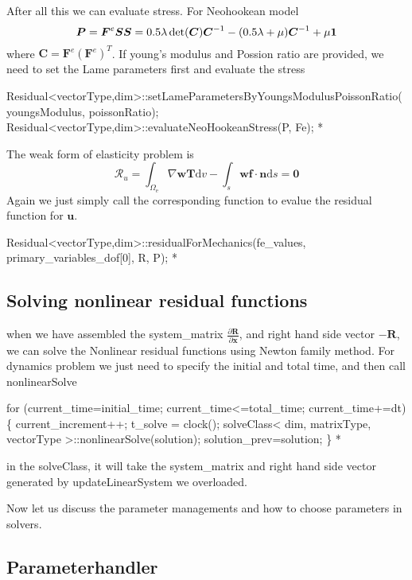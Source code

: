  After all this we can evaluate stress. For Neohookean model \[ \boldsymbol{P}=\boldsymbol{F}^e\boldsymbol{S}\\ \boldsymbol{S}=0.5\lambda\det(\boldsymbol{C})\boldsymbol{C}^{-1}-(0.5\lambda+\mu)\boldsymbol{C}^{-1}+\mu\boldsymbol{1} \] where $\boldsymbol{C}=\boldsymbol{F}^e(\boldsymbol{F}^e)^{T}$. If young's modulus and Possion ratio are provided, we need to set the Lame parameters first and evaluate the stress 
\begin{DoxyCode}
Residual<vectorType,dim>::setLameParametersByYoungsModulusPoissonRatio(youngsModulus, poissonRatio);
Residual<vectorType,dim>::evaluateNeoHookeanStress(P, Fe);
*
\end{DoxyCode}
 The weak form of elasticity problem is \[ \mathscr{R}_u=\int_{\Omega_{\text{e}}}\nabla \boldsymbol{w}\boldsymbol{T} \text{d}v- \int_{s}\boldsymbol{w} \boldsymbol{f} \cdot \boldsymbol{n} \text{d}s = \boldsymbol{0} \] Again we just simply call the corresponding function to evalue the residual function for $\boldsymbol{u}$. 
\begin{DoxyCode}
Residual<vectorType,dim>::residualForMechanics(fe\_values, primary\_variables\_dof[0], R, P);
*
\end{DoxyCode}
\hypertarget{brain_morph_solve}{}\subsection{Solving nonlinear residual functions}\label{brain_morph_solve}
when we have assembled the system\-\_\-matrix $\frac{\partial \boldsymbol{R}}{\partial \boldsymbol{x}} $, and right hand side vector $-\boldsymbol{R}$, we can solve the Nonlinear residual functions using Newton family method. For dynamics problem we just need to specify the initial and total time, and then call {\ttfamily nonlinear\-Solve} 
\begin{DoxyCode}
  \textcolor{keywordflow}{for} (current\_time=initial\_time; current\_time<=total\_time; current\_time+=dt)\{
    current\_increment++;
    t\_solve = clock();
        solveClass< dim, matrixType, vectorType >::nonlinearSolve(solution);
        solution\_prev=solution;
 \}
*
\end{DoxyCode}
 in the {\ttfamily solve\-Class}, it will take the system\-\_\-matrix and right hand side vector generated by {\ttfamily update\-Linear\-System} we overloaded.\par
 \par
 Now let us discuss the parameter managements and how to choose parameters in solvers. \hypertarget{brain_morph_parameter}{}\subsection{Parameterhandler}\label{brain_morph_parameter}
